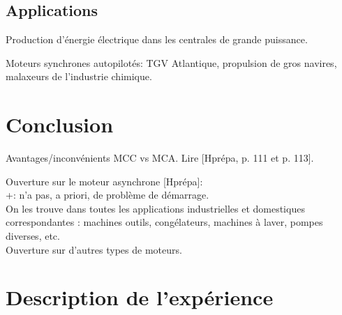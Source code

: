\documentclass[11pt]{report}
\numberwithin{figure}{section}
\numberwithin{equation}{section}
\numberwithin{table}{section}
\newcommand{\1}{\boldsymbol{1}}
\begin{document}
\subsection{Applications}

Production d'énergie électrique dans les centrales de grande puissance.

Moteurs synchrones autopilotés: TGV Atlantique, propulsion de gros navires, malaxeurs de l'industrie chimique.

\section*{Conclusion}


Avantages/inconvénients MCC vs MCA. Lire [Hprépa, p. 111 et p. 113].

Ouverture sur le moteur asynchrone [Hprépa]: \\
+: n'a pas, a priori, de problème de démarrage. \\
On les trouve dans toutes les applications industrielles et domestiques correspondantes : machines outils, congélateurs, machines à laver, pompes diverses, etc. \\



Ouverture sur d'autres types de moteurs.



\section*{Description de l'expérience}
\end{document}
